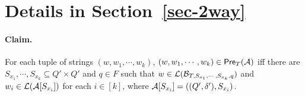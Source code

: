 
\section{Details in Section~\ref{sec-2way}}

\paragraph{Claim.} For each tuple of strings $(w, w_1,\cdots, w_k)$, $(w, w_1,\cdots, w_k) \in \textsf{Pre}_{T}(\mathcal{A})$ iff there are $S_{x_1}, \cdots, S_{x_k} \subseteq Q' \times Q'$ and $q \in F$ such that $w \in \mathcal{L}(\mathcal{B}_{T, S_{x_1}, \cdots, S_{x_k}, q})$ and $w_i \in \mathcal{L}(\mathcal{A}[S_{x_i}])$ for each $i \in [k]$, where $\mathcal{A}[S_{x_i}]=((Q', \delta'), S_{x_i})$.

